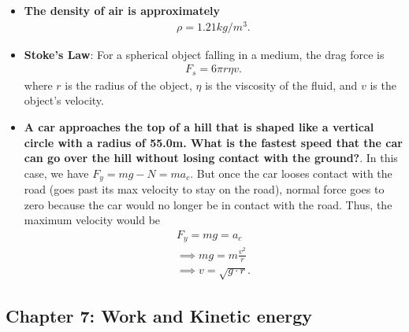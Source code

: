 \documentclass{report}
\begin{document}
\begin{itemize}
                \item \textbf{The density of air is approximately}
                    \begin{align*}
                        \rho = 1.21 kg /m^{3}
                    .\end{align*}
                \item \textbf{Stoke's Law}: For a spherical object falling in a medium, the drag force is
                    \begin{align*}
                        F_{s} = 6\pi r\eta v
                    .\end{align*}
                where $r$ is the radius of the object, $\eta$ is the viscosity of the fluid, and $v$ is the object’s velocity.
        \item \textbf{A car approaches the top of a hill that is shaped like a vertical circle with a radius of 55.0m. What is the fastest speed that the car can go over the hill without losing contact with the ground?}. In this case, we have $F_{y} = mg-N = ma_{c} $. But once the car looses contact with the road (goes past its max velocity to stay on the road), normal force goes to zero because the car would no longer be in contact with the road. Thus, the maximum velocity would be
            \begin{align*}
                F_{y} = mg = a_{c}  \\
                \implies mg = m\frac{v^{2}}{r} \\
                \implies v = \sqrt{g \cdot r}
            .\end{align*}

    \end{itemize}

    \pagebreak 
    \subsection{Chapter 7: Work and Kinetic energy}
    \bigbreak \noindent 
\end{document}
